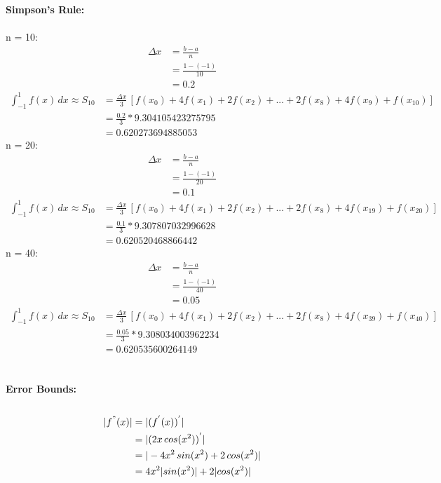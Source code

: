 \documentclass{article}
\begin{document}
    \textbf{Simpson's Rule:}\\\\
    n = 10:\\
    \begin{align*}
        \Delta x &= \frac{b-a}{n}\\
        &= \frac{1-(-1)}{10}\\
        &= 0.2
    \end{align*}
    \begin{align*}
        \int_{-1}^{1} f(x) \, dx \approx S_{10} &= \frac{\Delta x}{3} \, [f(x_0)+4f(x_1)+2f(x_2)+...+2f(x_8)+4f(x_9)+f(x_{10})] \\
        &= \frac{0.2}{3} * 9.304105423275795 \\
        &= 0.620273694885053
    \end{align*}
    n = 20:\\
    \begin{align*}
        \Delta x &= \frac{b-a}{n}\\
        &= \frac{1-(-1)}{20}\\
        &= 0.1
    \end{align*}
    \begin{align*}
        \int_{-1}^{1} f(x) \, dx \approx S_{10} &= \frac{\Delta x}{3} \, [f(x_0)+4f(x_1)+2f(x_2)+...+2f(x_8)+4f(x_19)+f(x_{20})] \\
        &= \frac{0.1}{3} * 9.307807032996628 \\
        &= 0.620520468866442
    \end{align*}
    n = 40:\\
    \begin{align*}
        \Delta x &= \frac{b-a}{n}\\
        &= \frac{1-(-1)}{40}\\
        &= 0.05
    \end{align*}
    \begin{align*}
        \int_{-1}^{1} f(x) \, dx \approx S_{10} &= \frac{\Delta x}{3} \, [f(x_0)+4f(x_1)+2f(x_2)+...+2f(x_8)+4f(x_39)+f(x_{40})] \\
        &= \frac{0.05}{3} * 9.308034003962234\\
        &= 0.620535600264149
    \end{align*} \\\\
    
    \textbf{Error Bounds:} \\\\
    \begin{align*}
       |f^{"}(x)| &= |(f^{'}(x))^{'}| \\
        &= |(2x \, cos(x^2))^{'}| \\
        &= |-4x^2\,sin(x^2)+2\,cos(x^2)| \\
        &= 4x^2|sin(x^2)| + 2|cos(x^2)|
    \end{align*}
\end{document}
